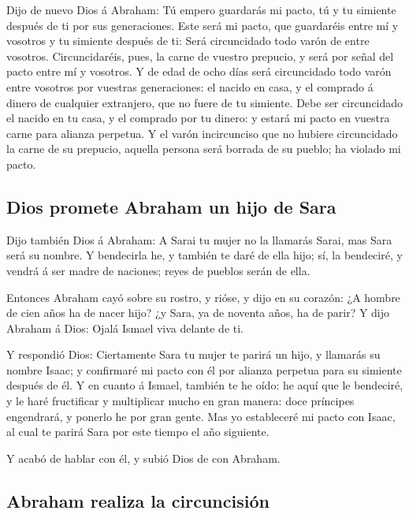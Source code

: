  Dijo de nuevo Dios á Abraham: Tú empero guardarás mi
pacto, tú y tu simiente después de ti por sus generaciones.
 Este será mi pacto, que guardaréis entre mí y vosotros y
tu simiente después de ti: Será circuncidado todo varón de entre
vosotros.  Circuncidaréis, pues, la carne de vuestro
prepucio, y será por señal del pacto entre mí y vosotros.
 Y de edad de ocho días será circuncidado todo varón
entre vosotros por vuestras generaciones: el nacido en casa, y el
comprado á dinero de cualquier extranjero, que no fuere de tu simiente.
 Debe ser circuncidado el nacido en tu casa, y el
comprado por tu dinero: y estará mi pacto en vuestra carne para alianza
perpetua.  Y el varón incircunciso que no hubiere
circuncidado la carne de su prepucio, aquella persona será borrada de su
pueblo; ha violado mi pacto.

\hypertarget{dios-promete-abraham-un-hijo-de-sara}{%
\subsection{Dios promete Abraham un hijo de
Sara}\label{dios-promete-abraham-un-hijo-de-sara}}

 Dijo también Dios á Abraham: A Sarai tu mujer no la
llamarás Sarai, mas Sara será su nombre.  Y bendecirla
he, y también te daré de ella hijo; sí, la bendeciré, y vendrá á ser
madre de naciones; reyes de pueblos serán de ella.

 Entonces Abraham cayó sobre su rostro, y rióse, y dijo
en su corazón: ¿A hombre de cien años ha de nacer hijo? ¿y Sara, ya de
noventa años, ha de parir?  Y dijo Abraham á Dios: Ojalá
Ismael viva delante de ti.

 Y respondió Dios: Ciertamente Sara tu mujer te parirá un
hijo, y llamarás su nombre Isaac; y confirmaré mi pacto con él por
alianza perpetua para su simiente después de él.  Y en
cuanto á Ismael, también te he oído: he aquí que le bendeciré, y le haré
fructificar y multiplicar mucho en gran manera: doce príncipes
engendrará, y ponerlo he por gran gente.  Mas yo
estableceré mi pacto con Isaac, al cual te parirá Sara por este tiempo
el año siguiente.

 Y acabó de hablar con él, y subió Dios de con Abraham.

\hypertarget{abraham-realiza-la-circuncisiuxf3n}{%
\subsection{Abraham realiza la
circuncisión}\label{abraham-realiza-la-circuncisiuxf3n}}

